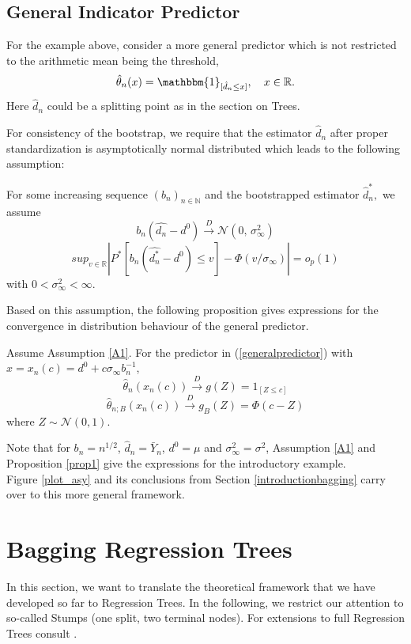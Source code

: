 \subsection{General Indicator Predictor}
For the example above, \cite{Buhlmann2002} consider a more general predictor which is not restricted to the arithmetic mean being the threshold,
\begin{equation}\label{generalpredictor}
\hat{\theta}_{n}(x) = \mathbbm{1}_{[\hat{d}_{n} \leq x]}, \quad x\in \mathbb{R}.
\end{equation}
Here $\hat{d}_{n}$ could be a splitting point as in the section on Trees.

For consistency of the bootstrap, we require that the estimator $\hat{d}_{n}$ after proper standardization is asymptotically normal distributed which leads to the following assumption:

\begin{assumption} \label{A1}
For some increasing sequence $(b_{n})_{n \in \mathbb{N}}$ and the bootstrapped estimator $\hat{d}_{n}^{*},$ we assume
$$b_{n}(\hat{d_{n}}-d^{0})\xrightarrow{D} \mathcal{N}(0,\,\sigma^{2}_{\infty})$$
$$sup_{v \in \mathbb{R}}|P^{*}[b_{n}(\hat{d_{n}^{*}}-d^{0}) \leq v]- \Phi(v/\sigma_{\infty})|= o_{p}(1)$$ with $0 < \sigma^{2}_{\infty} < \infty.$

\end{assumption}

Based on this assumption, the following proposition gives expressions for the convergence in distribution behaviour of the general predictor.
\begin{proposition}\label{prop1}
	Assume Assumption \ref{A1}. For the predictor in (\ref{generalpredictor}) with $x = 	x_{n}(c)= d^{0} + c\sigma_{\infty}b_{n}^{-1}$,
	$$
	\hat{\theta}_{n}(x_{n}(c)) \xrightarrow{D} g(Z)=1_{[Z \leq c]}
	$$
	$$
	\hat{\theta}_{n;B}(x_{n}(c)) \xrightarrow{D} g_{B}(Z)=\Phi(c-Z)
	$$
	where $Z \sim \mathcal{N}(0,1).$
\end{proposition}
Note that for $b_n=n^{1/2}$, $\hat{d}_{n}=\bar{Y}_n$, $d^{0}=\mu$ and $\sigma^{2}_{\infty}=\sigma^{2}$, Assumption \ref{A1} and Proposition \ref{prop1} give the expressions for the introductory example.\\
Figure \ref{plot_asy} and its conclusions from Section \ref{introductionbagging} carry over to this more general framework.

\section{Bagging Regression Trees}\label{sec:bagregtree}
In this section, we want to translate the theoretical framework that we have developed so far to Regression Trees.
In the following, we restrict our attention to so-called Stumps (one split, two terminal nodes). For extensions to full Regression Trees consult \cite{Buhlmann2002}.

